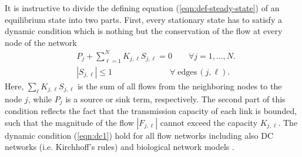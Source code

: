\documentclass[10pt,aps,pre,preprint,superscriptaddress]{revtex4-1}
\begin{document}
It is instructive to divide the defining equation 
(\ref{eqn:def-steady-state}) of an 
equilibrium state into two parts.
First, every stationary state has to satisfy a dynamic condition 
which is nothing but the conservation of the flow at every node
of the network
\begin{subequations}
\label{eqn:dc1}
\begin{align}
   & P_j + \sum_{\ell=1}^N K _{j,\ell} S_{j,\ell} = 0 \qquad 
              \forall j=1,\ldots,N. \\
  &  |S_{j,\ell}|   \le 1 \quad \qquad \qquad \qquad  
              \forall \; \mbox{edges} \, (j,\ell).
\end{align} 
\end{subequations}
Here, $\sum_\ell K_{j,\ell}S_{j,\ell}$ is the sum of all 
flows from the neighboring nodes to the node $j$, while 
$P_j$ is a source or sink term, respectively.
The second part of this condition reflects the fact that the
transmission capacity of each link is bounded, such that the
magnitude of the flow $|F_{j,\ell}|$ cannot exceed the capacity
$K_{j,\ell}$.  
The dynamic condition (\ref{eqn:dc1}) hold for
all flow networks including also DC networks (i.e. Kirchhoff's
rules) and biological network models \cite{Kati10}. 
\end{document}
